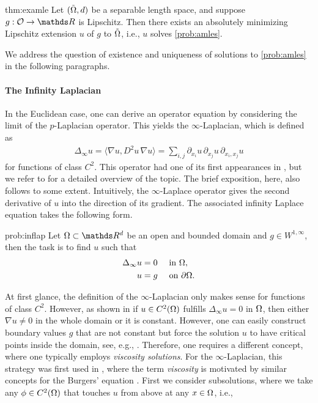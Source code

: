 \begin{theorem}{\cite[Thm. 4.3]{juutinen2002absolutely}}{thm:examle}
Let $(\tilde{\Omega}, d)$ be a separable length space, and suppose $g: \conset\to\R$ is Lipschitz. Then there exists an absolutely minimizing Lipschitz extension $u$ of $g$ to $\tilde{\Omega}$, i.e., $u$ solves \cref{prob:amles}.
\end{theorem}
%
\noindent%
We address the question of existence and uniqueness of solutions to \cref{prob:amles} in the following paragraphs.
%
%
\paragraph{The Infinity Laplacian} In the Euclidean case, one can derive an operator equation by considering the limit of the $p$-Laplacian operator. This yields the $\infty$-Laplacian, which is defined as
%
\begin{align*}
\Delta_\infty u = \langle \nabla u, D^2 u\, \nabla u\rangle = 
\sum_{i,j} \partial_{x_i} u\, \partial_{x_j} u\, \partial_{x_i,x_j} u
\end{align*}
%
for functions of class $C^2$. This operator had one of its first appearances in \cite{aronsson1968partial}, but we refer to \cite{lindqvist2017notes} for a detailed overview of the topic. The brief exposition, here, also follows \cite{lindqvist2017notes} to some extent. Intuitively, the $\infty$-Laplace operator gives the second derivative of $u$ into the direction of its gradient. The associated infinity Laplace equation takes the following form.
%
\begin{problem}{}{prob:inflap}
Let $\domain\subset\R^d$ be an open and bounded domain and $g\in W^{1,\infty}$, then the task is to find $u$ such that
%
\begin{align*}
\Delta_\infty u &= 0\quad\text{ in }\Omega,\\
u &= g\quad \text{ on }\partial\Omega.
\end{align*}
\end{problem}
%
\noindent%
At first glance, the definition of the $\infty$-Laplacian only makes sense for functions of class $C^2$. However, as shown in \cite{yu2006remark, aronsson1968partial} if $u\in C^2(\Omega)$ fulfills $\Delta_\infty u = 0$ in $\Omega$, then either $\nabla u \neq 0$ in the whole domain or it is constant. However, one can easily construct boundary values $g$ that are not constant but force the solution $u$ to have critical points inside the domain, see, e.g., \cite{lindqvist2016notes}. Therefore, one requires a different concept, where one typically employs \emph{viscosity solutions}. For the $\infty$-Laplacian, this strategy was first used in \cite{bhattacharya1989limits}, where the term \emph{viscosity} is motivated by similar concepts for the Burgers' equation \cite{burgers1948mathematical}. First we consider subsolutions, where we take any $\phi\in C^2(\Omega)$ that touches $u$ from above at any $x\in\Omega$, i.e.,
